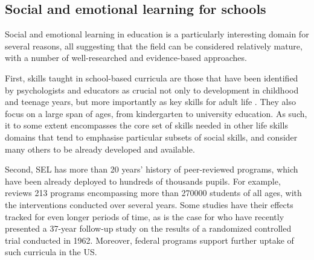 \documentclass[prodmode,acmtochi]{acmsmall}
\newcommand{\GeraldineFIX}[1]{}
\newcommand{\rephrase}[1]{\textrm{\textrm{\textcolor{gray}{#1}}}}
\begin{document}
\GeraldineFIX{ G: list these in a FOOTNOTE ...}
\GeraldineFIX{ G: also how do current footnotes 3\&4 mesh - they seem to be about the same thing but giving different figures??? P: some were only selected in the early version, other selected {\bf plus} highlighted -- it's a mess but I'll fix it later :)}






\subsection{Social and emotional learning for schools}
\label{sec:reasons}
Social and emotional learning in education is a particularly interesting domain for several reasons, all suggesting that the field can be considered relatively mature, with a number of well-researched and evidence-based approaches.
 

First, skills taught in school-based curricula are those that have been identified by psychologists and educators as crucial not only to development in childhood and teenage years, but more importantly as key skills for adult life \cite{Greenberg2010}. They also focus on a large span of ages, from kindergarten to university education. As such, it to some extent encompasses the core set of skills needed in other life skills domains that tend to emphasise particular subsets of social skills, and consider many others to be already developed and available. %

Second, SEL has more than 20 years' history of peer-reviewed programs, which have been already deployed to hundreds of thousands pupils. For example,  reviews 213 programs encompassing more than 270000 students of all ages, with the interventions conducted over several years.   Some studies have their effects tracked for even longer periods of time, as is the case for  who have recently presented a 37-year follow-up study on the results of a randomized controlled trial conducted in 1962. Moreover, federal programs support further uptake of such curricula in the US. 
\end{document}
